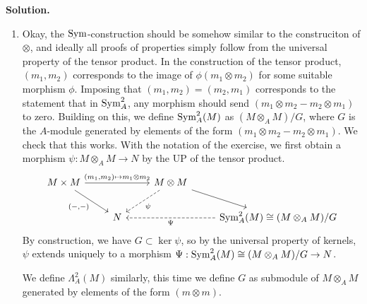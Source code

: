 \documentclass[a4paper,11pt]{article}
\begin{document}
\textbf{Solution.}
\begin{enumerate}
    \item
        Okay, the $\operatorname{Sym}$-construction should be somehow similar to the construciton
        of $\otimes$, and ideally all proofs of properties simply follow from
        the universal
        property of the tensor product. In the construction of the tensor product,
        $(m_1, m_2)$ corresponds to the image of $\phi(m_1 \otimes m_2)$ for 
        some suitable morphism $\phi$. Imposing that $(m_1, m_2) = (m_2, m_1)$ 
        corresponds to the statement that in $\operatorname{Sym}^2_A$, any morphism 
        should send $(m_1 \otimes m_2 - m_2 \otimes m_1)$ to zero. 
        Building on this, we define $\operatorname{Sym}^2_A(M)$ as $(M \otimes_A M)/ G$, where
        $G$ is the $A$-module generated by elements of the form $(m_1 \otimes m_2 -
        m_2 \otimes m_1)$. We check that this works. With the notation of the 
        exercise, we first obtain a morphism $\psi: M \otimes_A M \to N$ by
        the UP of the tensor product.
        \[\begin{tikzcd}[ampersand replacement=\&]
        	{M \times M} \&\& {M \otimes M} \\
        	\& N \&\& {\Sym^2_A(M) \cong (M \otimes_A M)/G}
        	\arrow["{(-,-)}"', from=1-1, to=2-2]
        	\arrow["{(m_1,m_2) \mapsto m_1 \otimes m_2}", from=1-1, to=1-3]
        	\arrow["\psi", dashed, from=1-3, to=2-2]
        	\arrow[from=1-3, to=2-4]
        	\arrow["\Psi", dashed, from=2-4, to=2-2]
        \end{tikzcd}\]
        By construction, we have $G \subset \ker \psi$, so by the universal property
        of kernels, $\psi$ extends uniquely to a morphism $\Psi: \operatorname{Sym}^2_A(M)
        \cong (M \otimes_A M) / G \to N$. 

        We define $\Lambda^2_A(M)$ similarly, this time we define $G$ as
        submodule of 
        $M \otimes_A M$ generated by elements of the form $(m \otimes m)$. 


\end{enumerate}
\end{document}
